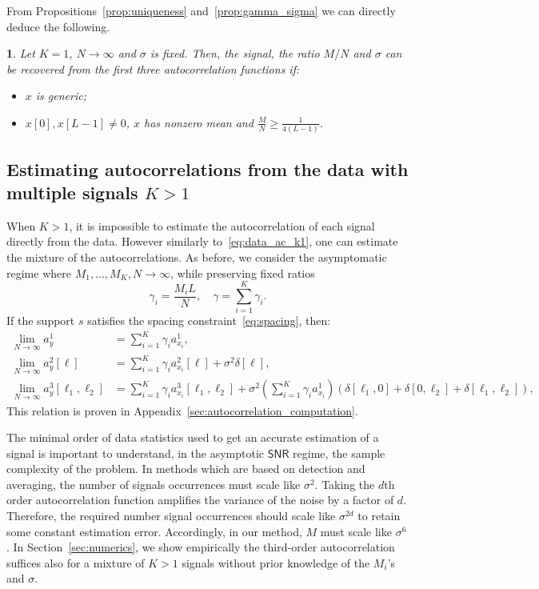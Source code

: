\documentclass[english,11pt]{article}
\newcommand{\TODO}[1]{{\color{red}{[#1]}}}
\numberwithin{equation}{section}
\theoremstyle{plain}
\theoremstyle{definition}
\theoremstyle{remark}
\theoremstyle{plain}
\theoremstyle{remark}
\theoremstyle{plain}
\newtheorem{corollary}[thm]{\protect\corollaryname}
\theoremstyle{plain}
\providecommand{\corollaryname}{Corollary}
\newcommand{\SNR}{{\textsf{SNR}}}
\begin{document}
From Propositions~\ref{prop:uniqueness} and~\ref{prop:gamma_sigma} we can directly deduce the following.
\begin{corollary}
	Let $K=1$, $N\to\infty$ and $\sigma$ is fixed. Then, the signal, the ratio $M/N$ and $\sigma$ can be recovered from the first three autocorrelation functions if:
	\begin{itemize}
		\item $x$ is generic;
		\item  $x[0],x[L-1]\neq 0$, $x$ has nonzero mean and $\frac{M}{N}\geq\frac{1}{4(L-1)}$.
	\end{itemize}
\end{corollary}
 
 
\subsection{Estimating autocorrelations from the data with multiple signals $K>1$} \label{sec:estimating_ac}

When $K>1$, it is impossible to estimate the autocorrelation of each signal directly from the data. However similarly to~\eqref{eq:data_ac_k1}, one can estimate the mixture of the autocorrelations. 
As before, we consider  the asymptomatic regime where $M_1,\ldots,M_K,N\to\infty$, while preserving fixed ratios
\begin{equation}
\gamma_i = \frac{M_i L}{N}, \quad \gamma = \sum_{i=1}^K\gamma_i.
\end{equation}
If the support $s$ satisfies the spacing constraint~\eqref{eq:spacing}, then:
\begin{align}
\lim_{N\to\infty} a_y^1 &= \sum_{i=1}^K\gamma_i a_{x_i}^1, \nonumber\\
\lim_{N\to\infty} a_y^2[\ell] &= \sum_{i=1}^K\gamma_i a_{x_i}^2[\ell] +\sigma^2\delta[\ell],  \label{eq:data_ac}\\
\lim_{N\to\infty} a_y^3[\ell_1,\ell_2] &= \sum_{i=1}^K\gamma_i a_{x_i}^3[\ell_1,\ell_2] + \sigma^2\left(\sum_{i=1}^K\gamma_i a_{x_i}^1\right)(\delta[\ell_1,0]+\delta[0,\ell_2]+\delta[\ell_1,\ell_2]), \nonumber
\end{align}
This relation is proven in  Appendix~\ref{sec:autocorrelation_computation}.

The minimal order of data statistics used to get an accurate estimation of a signal is important to understand, in the asymptotic $\SNR$ regime, the sample complexity of the problem.
In methods which are based on detection and averaging, the number of signals occurrences  must scale like $\sigma^2$. Taking the $d$th order autocorrelation function amplifies the variance of the noise by a factor of $d$. Therefore, the required number signal occurrences should scale like $\sigma^{2d}$  to retain some constant estimation error. Accordingly, in our  method, $M$ must scale like $\sigma^6$. In Section~\ref{sec:numerics}, we show empirically the third-order autocorrelation suffices also for a mixture of $K>1$ signals without prior knowledge of the $M_i$'s and $\sigma$.  \TODO{question mark on the entire paragraph}
\end{document}
